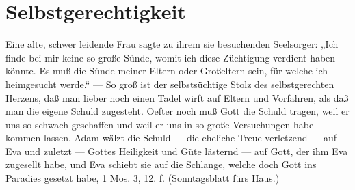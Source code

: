 \chapter{Selbstgerechtigkeit}

Eine alte, schwer leidende Frau sagte zu ihrem sie besuchenden Seelsorger: „Ich finde bei mir keine so große Sünde, womit ich diese Züchtigung verdient haben könnte. Es muß die Sünde meiner Eltern oder Großeltern sein, für welche ich heimgesucht werde.“ — So groß ist der selbstsüchtige Stolz des selbstgerechten Herzens, daß man lieber noch einen Tadel wirft auf Eltern und Vorfahren, als daß man die eigene Schuld zugesteht. Oefter noch muß Gott die Schuld tragen, weil er uns so schwach geschaffen und weil er uns in so große Versuchungen habe kommen lassen. Adam wälzt die Schuld — die eheliche
Treue verletzend — auf Eva und zuletzt — Gottes Heiligkeit und Güte lästernd — auf Gott, der ihm Eva zugesellt habe, und Eva schiebt sie auf die Schlange, welche doch Gott ins Paradies gesetzt habe, 1 Mos. 3, 12. f. (Sonntagsblatt fürs Haus.)
